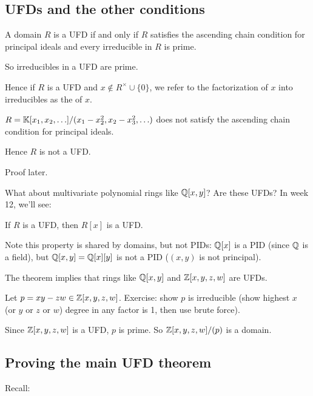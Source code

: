 \documentclass[12pt,letterpaper]{report}
\begin{document}
\pagebreak
\subsection{UFDs and the other conditions}

\begin{thm}{}{}
  A domain $R$ is a UFD if and only if $R$ satisfies the ascending chain condition for principal
  ideals and every irreducible in $R$ is prime.
\end{thm}

So irreducibles in a UFD are prime.

Hence if $R$ is a UFD and $x \not\in R^\times \cup \{0\}$, we refer to the factorization of $x$
into irreducibles as the  of $x$.

\begin{ex}
  $R = \mathbb{K}[x_1, x_2, \ldots]/(x_1 - x_2^2, x_2 - x_3^2, \ldots)$ does not satisfy the ascending
  chain condition for principal ideals.

  Hence $R$ is not a UFD.
\end{ex}

Proof later.

What about multivariate polynomial rings like $\mathbb{Q}[x, y]$?
Are these UFDs?
In week 12, we'll see:

\begin{thm}{}{}
  If $R$ is a UFD, then $R[x]$ is a UFD.
\end{thm}

Note this property is shared by domains, but not PIDs: $\mathbb{Q}[x]$ is a PID (since $\mathbb{Q}$ is a field),
but $\mathbb{Q}[x, y] = \mathbb{Q}[x][y]$ is not a PID ($(x, y)$ is not principal).

The theorem implies that rings like $\mathbb{Q}[x, y]$ and $\mathbb{Z}[x, y, z, w]$ are UFDs.

\begin{ex}
  Let $p = xy - zw \in \mathbb{Z}[x, y, z, w]$.
  Exercise: show $p$ is irreducible (show highest $x$ (or $y$ or $z$ or $w$) degree in any factor
  is 1, then use brute force).

  Since $\mathbb{Z}[x, y, z, w]$ is a UFD, $p$ is prime.
  So $\mathbb{Z}[x, y, z, w]/(p)$ is a domain.
\end{ex}

\pagebreak
\subsection{Proving the main UFD theorem}

Recall:
\end{document}
